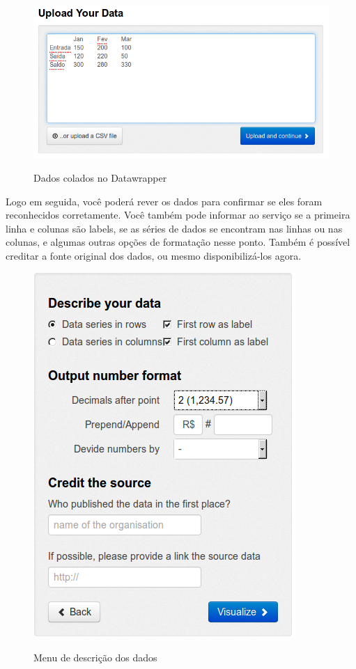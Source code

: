 \documentclass[12pt,onecolumn]{article}
\begin{document}
    \begin{figure}[H]
      \begin{center}
        \includegraphics[scale = 0.4]{dados-datawrapper.png}
        \label{fig:}
        \caption{Dados colados no Datawrapper}
      \end{center}
    \end{figure}
    
    Logo em seguida, você poderá rever os dados para confirmar se eles foram
    reconhecidos corretamente. Você também pode informar ao serviço se a primeira
    linha e colunas são labels, se as séries de dados se encontram nas linhas ou
    nas colunas, e algumas outras opções de formatação nesse ponto. Também é
    possível creditar a fonte original dos dados, ou mesmo disponibilizá-los agora.
    
    \begin{figure}[H]
      \begin{center}
        \includegraphics[scale = 0.5]{datawrapper-describe.png}
        \label{fig:datawrapper-describe}
        \caption{Menu de descrição dos dados}
      \end{center}
    \end{figure}
    
\end{document}
